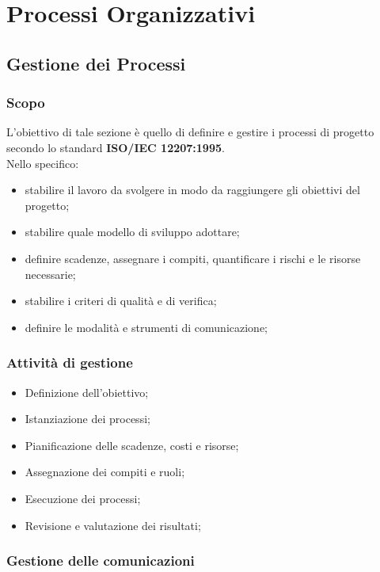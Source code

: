 \section{Processi Organizzativi}
    \subsection{Gestione dei Processi}
        \subsubsection{Scopo}
            L'obiettivo di tale sezione è quello di definire e gestire i processi di progetto secondo lo standard \textbf{ISO/IEC 12207:1995}. \\
            Nello specifico:
            \begin{itemize}
                \item stabilire il lavoro da svolgere in modo da raggiungere gli obiettivi del progetto;
                \item stabilire quale modello di sviluppo adottare;
                \item definire scadenze, assegnare i compiti, quantificare i rischi e le risorse necessarie;
                \item stabilire i criteri di qualità e di verifica;
                \item definire le modalità e strumenti di comunicazione;
            \end{itemize}

        \subsubsection{Attività di gestione}
            \begin{itemize}
                \item Definizione dell'obiettivo;
                \item Istanziazione dei processi;
                \item Pianificazione delle scadenze, costi e risorse;
                \item Assegnazione dei compiti e ruoli;
                \item Esecuzione dei processi;
                \item Revisione e valutazione dei risultati;
            \end{itemize}

        \subsubsection{Gestione delle comunicazioni}
